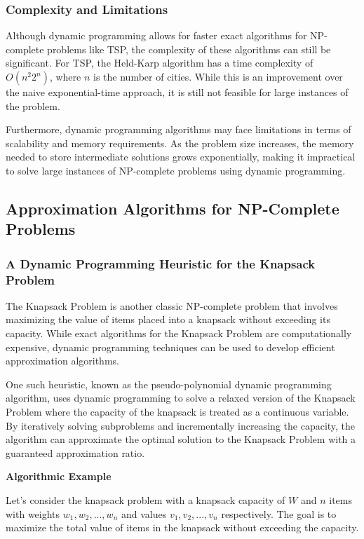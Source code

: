 \documentclass[12pt]{book} %
\begin{document}
\subsubsection{Complexity and Limitations}

Although dynamic programming allows for faster exact algorithms for NP-complete problems like TSP, the complexity of these algorithms can still be significant. For TSP, the Held-Karp algorithm has a time complexity of \(O(n^2 2^n)\), where \(n\) is the number of cities. While this is an improvement over the naive exponential-time approach, it is still not feasible for large instances of the problem.

Furthermore, dynamic programming algorithms may face limitations in terms of scalability and memory requirements. As the problem size increases, the memory needed to store intermediate solutions grows exponentially, making it impractical to solve large instances of NP-complete problems using dynamic programming.

\subsection{Approximation Algorithms for NP-Complete Problems}

\subsubsection{A Dynamic Programming Heuristic for the Knapsack Problem}

The Knapsack Problem is another classic NP-complete problem that involves maximizing the value of items placed into a knapsack without exceeding its capacity. While exact algorithms for the Knapsack Problem are computationally expensive, dynamic programming techniques can be used to develop efficient approximation algorithms.

One such heuristic, known as the pseudo-polynomial dynamic programming algorithm, uses dynamic programming to solve a relaxed version of the Knapsack Problem where the capacity of the knapsack is treated as a continuous variable. By iteratively solving subproblems and incrementally increasing the capacity, the algorithm can approximate the optimal solution to the Knapsack Problem with a guaranteed approximation ratio.

\textbf{Algorithmic Example}

Let's consider the knapsack problem with a knapsack capacity of $W$ and $n$ items with weights $w_1, w_2, ..., w_n$ and values $v_1, v_2, ..., v_n$ respectively. The goal is to maximize the total value of items in the knapsack without exceeding the capacity.
 
\end{document}
